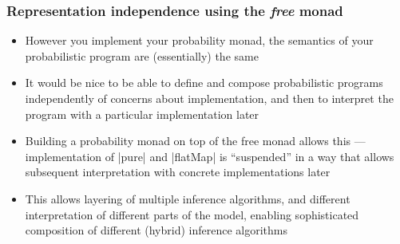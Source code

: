\documentclass[mathserif,handout]{beamer}
\begin{document}
\begin{frame}[fragile]
  \frametitle{Representation independence using the \emph{free} monad}
  \begin{itemize}
  \item However you implement your probability monad, the semantics of your probabilistic program are (essentially) the same
  \item It would be nice to be able to define and compose probabilistic programs independently of concerns about implementation, and then to \alert{interpret} the program with a particular implementation later
  \item Building a probability monad on top of the \alert{free monad} allows this --- implementation of |pure| and |flatMap| is ``suspended'' in a way that allows subsequent interpretation with concrete implementations later
    \item This allows \alert{layering} of multiple inference algorithms, and different interpretation of different parts of the model, enabling sophisticated \alert{composition} of different (hybrid) inference algorithms
    \end{itemize}
\end{frame}

\end{document}
